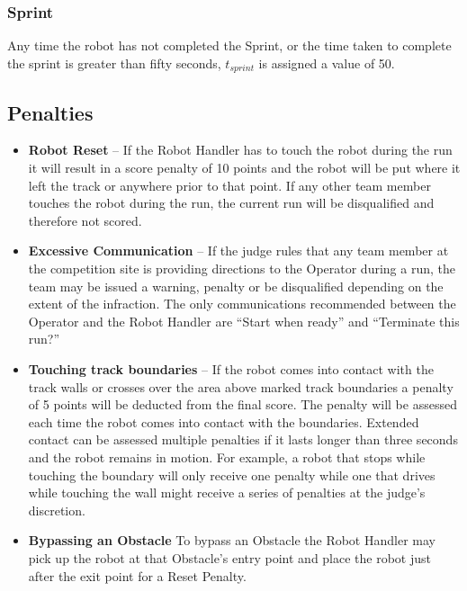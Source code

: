 \subsubsection{Sprint}
Any time the robot has not completed the Sprint, or the time taken to complete the sprint is greater than fifty seconds, $t_{sprint}$ is assigned a value of 50. 

\subsection{Penalties}
\begin{itemize}
\item \textbf{Robot Reset} – If the Robot Handler has to touch the robot during the run it will result in a score penalty of 10 points and the robot will be put where it left the track or anywhere prior to that point. If any other team member touches the robot during the run, the current run will be disqualified and therefore not scored.
\item \textbf{Excessive Communication} – If the judge rules that any team member at the competition site is providing directions to the Operator during a run, the team may be issued a warning, penalty or be disqualified depending on the extent of the infraction. The only communications recommended between the Operator and the Robot Handler are “Start when ready” and “Terminate this run?” 
\item \textbf{Touching track boundaries} – If the robot comes into contact with the track walls or crosses over the area above marked track boundaries a penalty of 5 points will be deducted from the final score. The penalty will be assessed each time the robot comes into contact with the boundaries. Extended contact can be assessed multiple penalties if it lasts longer than three seconds and the robot remains in motion. For example, a robot that stops while touching the boundary will only receive one penalty while one that drives while touching the wall might receive a series of penalties at the judge’s discretion.
\item \textbf{Bypassing an Obstacle}
\label{bypass}
To bypass an Obstacle the Robot Handler may pick up the robot at that Obstacle’s entry point and place the robot just after the exit point for a Reset Penalty.
\end{itemize}


